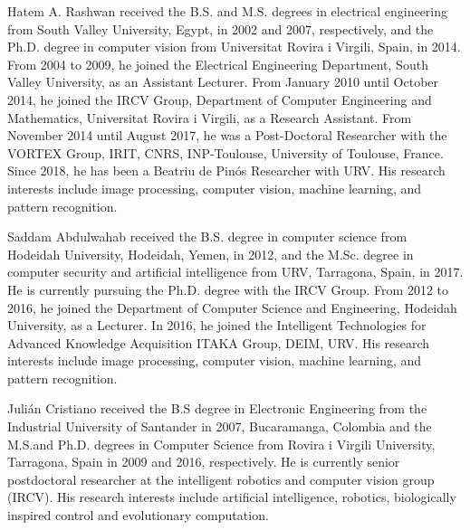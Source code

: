\documentclass[journal]{IEEEtran}
\begin{document}
\begin{IEEEbiography}
{Hatem A. Rashwan}
received the B.S. and M.S. degrees in electrical engineering from South Valley University, Egypt, in 2002 and 2007, respectively, and the Ph.D. degree in computer vision from Universitat Rovira i Virgili, Spain, in 2014. From 2004 to 2009, he joined the Electrical Engineering Department, South Valley University, as an Assistant Lecturer. From January 2010 until October 2014, he joined the IRCV Group, Department of Computer Engineering and Mathematics, Universitat Rovira i Virgili, as a Research Assistant. From November 2014 until August 2017, he was a Post-Doctoral Researcher with the VORTEX Group, IRIT, CNRS, INP-Toulouse, University of Toulouse, France. Since 2018, he has been a Beatriu de Pinós Researcher with URV. His research interests include image processing, computer vision, machine learning, and pattern recognition.
\end{IEEEbiography}

\begin{IEEEbiography}
{Saddam Abdulwahab}
received the B.S. degree in computer science from Hodeidah University, Hodeidah, Yemen, in 2012, and the M.Sc. degree in computer security and artificial intelligence from URV, Tarragona, Spain, in 2017. He is currently pursuing the Ph.D. degree with the IRCV Group. From 2012 to 2016, he joined the Department of Computer Science and Engineering, Hodeidah University, as a Lecturer. In 2016, he joined the Intelligent Technologies for Advanced Knowledge Acquisition ITAKA Group, DEIM, URV. His research interests include image processing, computer vision, machine learning, and pattern recognition.
\end{IEEEbiography}

\begin{IEEEbiography}
{Julián Cristiano}
received the B.S degree in Electronic Engineering from the Industrial University of Santander in 2007, Bucaramanga, Colombia and the M.S.and Ph.D. degrees in Computer Science from Rovira i Virgili University, Tarragona, Spain in 2009 and 2016, respectively. He is currently senior postdoctoral researcher at the intelligent robotics and computer vision group (IRCV). His research interests include artificial intelligence, robotics, biologically inspired control and evolutionary computation.
\end{IEEEbiography}
\end{document}
